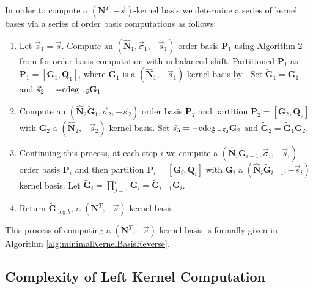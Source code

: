 In order to compute a $\left(\mathbf{N}^{T},-\vec{s}\right)$-kernel
basis we determine a series of kernel bases via a series of order
basis computations as follows:
\begin{enumerate}
\item Let $\vec{s}_{1}=\vec{s}$. Compute an $\left(\hat{\mathbf{N}}_{1},\vec{\sigma}_{1},-\vec{s}_{1}\right)$
order basis $\mathbf{P}_{1}$ using Algorithm 2 from \cite{za2009}
for order basis computation with unbalanced shift. Partitioned $\mathbf{P}_{1}$
as $\mathbf{P}_{1}=\left[\mathbf{G}_{1},\mathbf{Q}_{1}\right]$, where
$\mathbf{G}_{1}$ is a $\left(\hat{\mathbf{N}}_{1},-\vec{s}_{1}\right)$-kernel
basis by .
Set $\tilde{\mathbf{G}}_{1}=\mathbf{G}_{1}$ and $\vec{s}_{2}=-{\rm cdeg}\,_{-\vec{s}}\mathbf{G}_{1}$. 
\item Compute an $\left(\hat{\mathbf{N}}_{2}\tilde{\mathbf{G}}_{1},\vec{\sigma}_{2},-\vec{s}_{2}\right)$
order basis $\mathbf{P}_{2}$ and partition $\mathbf{P}_{2}=\left[\mathbf{G}_{2},\mathbf{Q}_{2}\right]$
with $\mathbf{G}_{2}$ a $\left(\hat{\mathbf{N}}_{2},-\vec{s}_{2}\right)$
kernel basis. Set $\vec{s}_{3}=-{\rm cdeg}\,_{-\vec{s}_{2}}\mathbf{G}_{2}$
and $\tilde{\mathbf{G}}_{2}=\tilde{\mathbf{G}}_{1}\mathbf{G}_{2}$.
\item Continuing this process, at each step $i$ we compute a $\left(\hat{\mathbf{N}}_{i}\tilde{\mathbf{G}}_{i-1},\vec{\sigma}_{i},-\vec{s}_{i}\right)$
order basis $\mathbf{P}_{i}$ and then partition $\mathbf{P}_{i}=\left[\mathbf{G}_{i},\mathbf{Q}_{i}\right]$
with $\mathbf{G}_{i}$ a $\left(\hat{\mathbf{N}}_{i}\tilde{\mathbf{G}}_{i-1},-\vec{s}_{i}\right)$
kernel basis. Let $\tilde{\mathbf{G}}_{i}=\prod_{j=1}^{i}\mathbf{G}_{i}=\tilde{\mathbf{G}}_{i-1}\mathbf{G}_{i}$. 
\item Return $\tilde{\mathbf{G}}_{\log k}$, a $\left(\mathbf{N}^{T},-\vec{s}\right)$-kernel
basis. 
\end{enumerate}
This process of computing a $\left(\mathbf{N}^{T},-\vec{s}\right)$-kernel
basis is formally given in Algorithm \ref{alg:minimalKernelBasisReverse}.


\subsection{Complexity of Left Kernel Computation}


